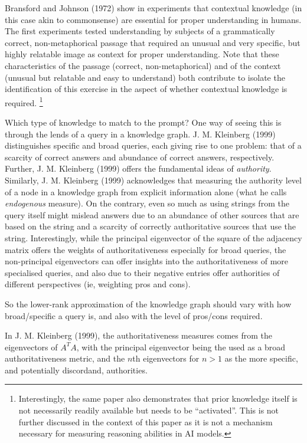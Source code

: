 \documentclass[
]{article}
\begin{document}
Bransford and Johnson (1972) show in experiments that contextual
knowledge (in this case akin to commonsense) are essential for proper
understanding in humans. The first experiments tested understanding by
subjects of a grammatically correct, non-metaphorical passage that
required an unusual and very specific, but highly relatable image as
context for proper understanding. Note that these characteristics of the
passage (correct, non-metaphorical) and of the context (unusual but
relatable and easy to understand) both contribute to isolate the
identification of this exercise in the aspect of whether contextual
knowledge is required. \footnote{Interestingly, the same paper also
  demonstrates that prior knowledge itself is not necessarily readily
  available but needs to be ``activated''. This is not further discussed
  in the context of this paper as it is not a mechanism necessary for
  measuring reasoning abilities in AI models.}

Which type of knowledge to match to the prompt? One way of seeing this
is through the lends of a query in a knowledge graph. J. M. Kleinberg
(1999) distinguishes specific and broad queries, each giving rise to one
problem: that of a scarcity of correct answers and abundance of correct
answers, respectively. Further, J. M. Kleinberg (1999) offers the
fundamental ideas of \emph{authority}. Similarly, J. M. Kleinberg (1999)
acknowledges that measuring the authority level of a node in a knowledge
graph from explicit information alone (what he calls \emph{endogenous}
measure). On the contrary, even so much as using strings from the query
itself might mislead answers due to an abundance of other sources that
are based on the string and a scarcity of correctly authoritative
sources that use the string. Interestingly, while the principal
eigenvector of the square of the adjacency matrix offers the weights of
authoritativeness especially for broad queries, the non-principal
eigenvectors can offer insights into the authoritativeness of more
specialised queries, and also due to their negative entries offer
authorities of different perspectives (ie, weighting pros and cons).

So the lower-rank approximation of the knowledge graph should vary with
how broad/specific a query is, and also with the level of pros/cons
required.

In J. M. Kleinberg (1999), the authoritativeness measures comes from the
eigenvectors of \(A^TA\), with the principal eigenvector being the used
as a broad authoritativeness metric, and the \(n\)th eigenvectors for
\(n>1\) as the more specific, and potentially discordand, authorities.
\end{document}
